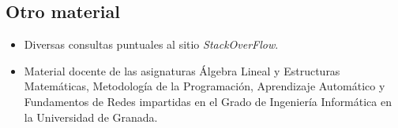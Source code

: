 \documentclass[a4paper,11pt]{book}
\begin{document}


\frontmatter
\tableofcontents
\listoffigures
\listoftables
\mainmatter


%

%
%

%

%

%
%
%
%
%
%
%
%
%
%
%


\section*{Otro material}
\begin{itemize}
  \item Diversas consultas puntuales al sitio \emph{StackOverFlow}.
  \item Material docente de las asignaturas Álgebra Lineal y Estructuras Matemáticas, Metodología de la Programación, Aprendizaje Automático y Fundamentos de Redes impartidas en el Grado de Ingeniería Informática en la Universidad de Granada.
\end{itemize}

\label{vernam-ref}


\appendix
%
%
\chapter*{}
\thispagestyle{empty}
\end{document}
